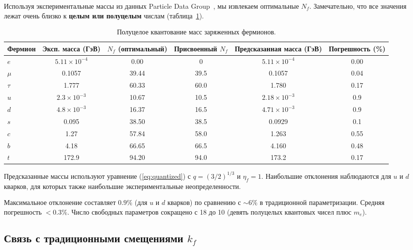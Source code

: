 \documentclass[12pt,a4paper]{article}
\begin{document}
	Используя экспериментальные массы из данных Particle Data Group~\cite{PDG2024}, мы извлекаем оптимальные $N_f$. Замечательно, что все значения лежат очень близко к \textbf{целым или полуцелым} числам (таблица~\ref{tab:masses}).
	
	\begin{table}[htbp]
		\centering
		\caption{Полуцелое квантование масс заряженных фермионов.}
		\label{tab:masses}
		\begin{tabular}{l c c c c c}
			\toprule
			Фермион & Эксп. масса (ГэВ) & $N_f$ (оптимальный) & Присвоенный $N_f$ & Предсказанная масса (ГэВ) & Погрешность (\%) \\
			\midrule
			$e$   & $5.11\times10^{-4}$ & 0.00  & 0      & $5.11\times10^{-4}$ & 0.00 \\
			$\mu$  & 0.1057                & 39.44 & 39.5   & 0.1057               & 0.04 \\
			$\tau$ & 1.777                 & 60.33 & 60.0   & 1.780                & 0.17 \\
			$u$   & $2.3\times10^{-3}$    & 10.67 & 10.5   & $2.18\times10^{-3}$  & 0.9 \\
			$d$   & $4.8\times10^{-3}$    & 16.37 & 16.5   & $4.71\times10^{-3}$  & 0.9 \\
			$s$   & 0.095                 & 38.50 & 38.5   & 0.0929               & 0.1 \\
			$c$   & 1.27                  & 57.84 & 58.0   & 1.263                & 0.55 \\
			$b$   & 4.18                  & 66.65 & 66.5   & 4.160                & 0.48 \\
			$t$   & 172.9                 & 94.20 & 94.0   & 173.2                & 0.17 \\
			\bottomrule
		\end{tabular}
		\par\smallskip
		\footnotesize Предсказанные массы используют уравнение (\ref{eq:quantized}) с $q = (3/2)^{1/3}$ и $\eta_f = 1$. Наибольшие отклонения наблюдаются для $u$ и $d$ кварков, для которых также наибольшие экспериментальные неопределенности.
	\end{table}
	
	Максимальное отклонение составляет $0.9\%$ (для $u$ и $d$ кварков) по сравнению с $\sim 6\%$ в традиционной параметризации. Средняя погрешность $<0.3\%$. Число свободных параметров сокращено с 18 до 10 (девять полуцелых квантовых чисел плюс $m_e$).
	
	\subsection{Связь с традиционными смещениями $k_f$}
	
\end{document}
